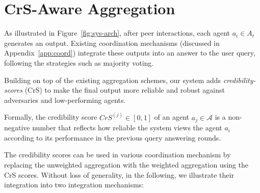 \section{CrS-Aware Aggregation}\label{sec:agg}

As illustrated in Figure~\ref{fig:sys-arch}, after peer interactions, each agent $a_i\in A_t$ generates an output.
Existing coordination mechanisms (discussed in Appendix~\ref{app:coord}) integrate these outputs into an answer to the user query, following the strategies such as majority voting.

Building on top of the existing aggregation schemes, our system adds {\em credibility-scores} (CrS) to make the final output more reliable and robust against adversaries and low-performing agents.

Formally, the credibility score $CrS^{(j)}\in [0,1]$
of an agent $a_j\in \mathcal{A}$ is a {non-negative} number that reflects how reliable the system views the agent $a_i$ according to its performance in the previous query answering rounds. 

The credibility scores can be used in various coordination mechanism by replacing the unweighted aggregation with the weighted aggregation using the CrS scores.
Without loss of generality, in the following, we illustrate their integration into two integration mechanisms:





